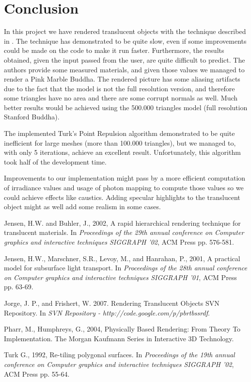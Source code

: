 \documentclass{article}
\begin{document}
\section{Conclusion}
In this project we have rendered translucent objects with the technique described in \cite{HierarchicalSSS}. The technique has demonstrated to be quite slow, even if some improvements could be made on the code to make it run faster. Furthermore, the results obtained, given the input passed from the user, are quite difficult to predict. The authors provide some measured materials, and given those values we managed to render a Pink Marble Buddha. The rendered picture has some aliasing artifacts due to the fact that the model is not the full resolution version, and therefore some triangles have no area and there are some corrupt normals as well. Much better results would be achieved using the 500.000 triangles model (full resolution Stanford Buddha).

The implemented Turk's Point Repulsion algorithm demonstrated to be quite inefficient for large meshes (more than 100.000 triangles), but we managed to, with only 5 iterations, achieve an excellent result. Unfortunately, this algorithm took half of the development time.

Improvements to our implementation might pass by a more efficient computation of irradiance values and usage of photon mapping to compute those values so we could achieve effects like caustics. Adding specular highlights to the translucent object might as well add some realism in some cases.

\begin{thebibliography}{99}

 Jensen, H.W.  and Buhler, J., 2002, A rapid hierarchical rendering technique for translucent materials. In {\it Proceedings of the 29th annual conference on Computer graphics and interactive techniques SIGGRAPH '02}, ACM Press pp. 576-581.

 Jensen, H.W., Marschner, S.R., Levoy, M., and Hanrahan, P., 2001, A practical model for subsurface light transport. In {\it Proceedings of the 28th annual conference on Computer graphics and interactive techniques SIGGRAPH '01}, ACM Press pp. 63-69.

 Jorge, J. P., and Frishert, W. 2007. Rendering Translucent Objects SVN Repository. In {\it SVN Repository - http:\slash \slash code.google.com\slash p\slash pbrtbssrdf}.

 Pharr, M., Humphreys, G., 2004, Physically Based Rendering: From Theory To Implementation. The Morgan Kaufmann Series in Interactive 3D Technology.

 Turk G., 1992, Re-tiling polygonal surfaces. In {\it Proceedings of the 19th annual conference on Computer graphics and interactive techniques SIGGRAPH '02}, ACM Press pp. 55-64.

\end{thebibliography}
\end{document}

